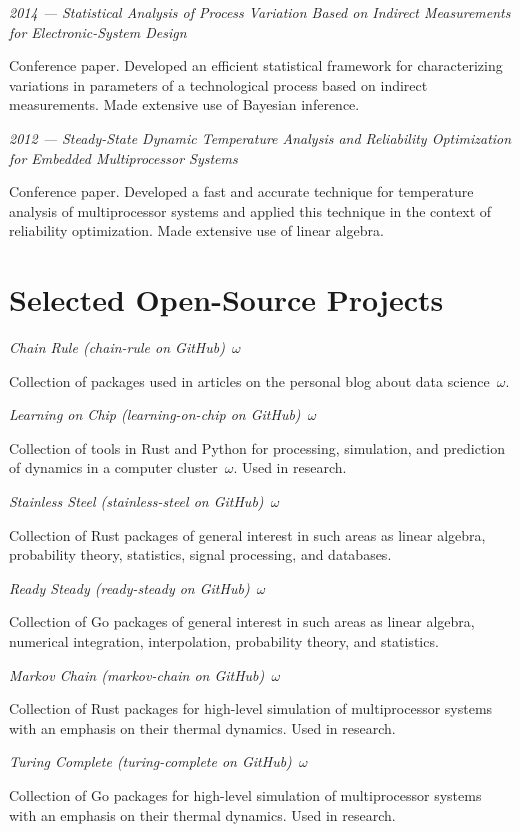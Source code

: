 \documentclass[journal]{IEEEtran}
\begin{document}
\emph{2014 --- Statistical Analysis of Process Variation Based on Indirect
Measurements for Electronic-System Design} \cite{ukhov2014a}

Conference paper. Developed an efficient statistical framework for
characterizing variations in parameters of a technological process based on
indirect measurements. Made extensive use of Bayesian inference.

\emph{2012 --- Steady-State Dynamic Temperature Analysis and Reliability
Optimization for Embedded Multiprocessor Systems} \cite{ukhov2012}

Conference paper. Developed a fast and accurate technique for temperature
analysis of multiprocessor systems and applied this technique in the context of
reliability optimization. Made extensive use of linear algebra.

\section{Selected Open-Source Projects}

\emph{Chain Rule (chain-rule on GitHub)~$\omega$}

Collection of packages used in articles on the personal blog about data
science~$\omega$.

\emph{Learning on Chip (learning-on-chip on GitHub)~$\omega$}

Collection of tools in Rust and Python for processing, simulation, and
prediction of dynamics in a computer cluster~$\omega$. Used in research.

\emph{Stainless Steel (stainless-steel on GitHub)~$\omega$}

Collection of Rust packages of general interest in such areas as linear algebra,
probability theory, statistics, signal processing, and databases.

\emph{Ready Steady (ready-steady on GitHub)~$\omega$}

Collection of Go packages of general interest in such areas as linear algebra,
numerical integration, interpolation, probability theory, and statistics.

\emph{Markov Chain (markov-chain on GitHub)~$\omega$}

Collection of Rust packages for high-level simulation of multiprocessor systems
with an emphasis on their thermal dynamics. Used in research.

\emph{Turing Complete (turing-complete on GitHub)~$\omega$}

Collection of Go packages for high-level simulation of multiprocessor systems
with an emphasis on their thermal dynamics. Used in research.
\end{document}
